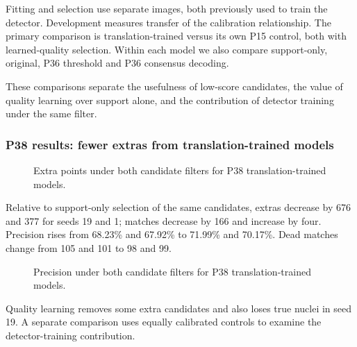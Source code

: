 \documentclass[
  12pt,
]{article}
\begin{document}
\begin{center}\end{center}
Fitting and selection use separate images, both previously used to train the detector. Development measures transfer of the calibration relationship. The primary comparison is translation-trained versus its own P15 control, both with learned-quality selection. Within each model we also compare support-only, original, P36 threshold and P36 consensus decoding.

These comparisons separate the usefulness of low-score candidates, the value of quality learning over support alone, and the contribution of detector training under the same filter.

\subsubsection{P38 results: fewer extras from translation-trained models}\label{chapter35}
\begin{figure}[H]\centering\caption{Extra points under both candidate filters for P38 translation-trained models.}\end{figure}
Relative to support-only selection of the same candidates, extras decrease by 676 and 377 for seeds 19 and 1; matches decrease by 166 and increase by four. Precision rises from 68.23\% and 67.92\% to 71.99\% and 70.17\%. Dead matches change from 105 and 101 to 98 and 99.

\begin{figure}[H]\centering\caption{Precision under both candidate filters for P38 translation-trained models.}\end{figure}
Quality learning removes some extra candidates and also loses true nuclei in seed 19. A separate comparison uses equally calibrated controls to examine the detector-training contribution.
\end{document}
